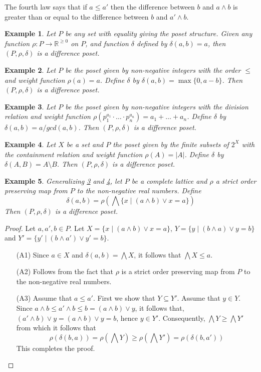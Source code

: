 \documentclass[acmsmall,review,anonymous]{acmart}\settopmatter{printfolios=true,printccs=false,printacmref=false}
\newtheorem{example}{Example}
\begin{document}
The fourth law says that if $a \leq a'$ then the difference between $b$
and $a \wedge b$ is greater than or equal to the difference between $b$ and $a'
\wedge b$.
\fi
\begin{example}\label{embedding}
Let $P$ be any set with equality giving the poset structure. Given any
function $\rho: P \longrightarrow \mathbb{R}^{\geq 0}$ on $P$, and function
$\delta$ defined by $\delta(a, b) = a$, then $(P, \rho, \delta)$ is a difference
poset.
\end{example}
\begin{example}\label{naturalnumbers}
Let $P$ be the poset given by non-negative integers with the order $\leq$ and
weight function $\rho(a) = a$. Define $\delta$ by $\delta(a, b) = \max\{0,
a-b\}$. Then $(P, \rho, \delta)$ is a difference poset.
\end{example}
\begin{example}\label{divisibility}
Let $P$ be the poset given by non-negative integers with the division
relation and weight function $\rho(p_1^{a_1} \cdot \ldots \cdot p_n^{a_n}) =
a_1 + \ldots + a_n$. Define $\delta$ by $\delta(a, b) = a/gcd(a, b)$. Then $(P,
\rho, \delta)$ is a difference poset.
\end{example}
\begin{example}\label{boolean}
Let $X$ be a set and $P$ the poset given by the finite subsets of $2^X$ with the
containment relation and weight function $\rho(A) = |A|$. Define $\delta$
by $\delta(A, B) = A \setminus B$. Then $(P, \rho, \delta)$ is a difference
poset.
\end{example}
\begin{example}\label{general}
Generalizing \cref{divisibility} and \cref{boolean}, let $P$ be a complete
lattice and $\rho$ a strict order preserving map from $P$ to the non-negative
real numbers. Define $$\delta(a, b) = \rho\left(\bigwedge \{x \; | \; (a \wedge
b) \vee x = a\}\right)$$
Then $(P, \rho, \delta)$ is a difference poset.
\end{example}
\begin{proof}
Let $a, a', b \in P$.  Let $X = \{x \; | \; (a \wedge b) \vee x =  a\}$, $Y =
\{y \; | \; (b \wedge a) \vee y = b\}$ and $Y' = \{y' \; | \; (b \wedge a')
\vee y' = b\}$.
\begin{enumerate}
  \item[(A1)]
  Since $a \in X$ and $\delta(a, b) = \bigwedge X$, it follows that
  $\bigwedge X \leq a$.
  \item[(A2)]
  Follows from the fact that $\rho$ is a strict order preserving map from $P$ to
  the non-negative real numbers.
  \item[(A3)]
  Assume that $a \leq a'$. First we show that $Y \subseteq Y'$. Assume that
  $y \in Y$. Since $a \wedge b \leq a' \wedge b \leq b = (a \wedge b) \vee y$,
  it follows that, $(a' \wedge b) \vee y = (a \wedge b) \vee y = b$, hence $y
  \in Y'$. Consequently, $\bigwedge Y \geq \bigwedge Y'$ from which it follows
  that $$\rho(\delta(b, a)) =\rho\left(\bigwedge Y\right) \geq
  \rho\left(\bigwedge Y'\right) = \rho(\delta(b, a'))$$
  This completes the proof.
\end{enumerate}
\end{proof}
\end{document}
